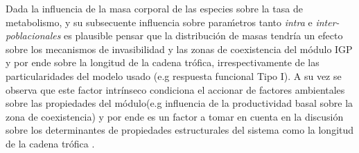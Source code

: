 Dada la influencia de la masa corporal de las especies sobre la tasa de metabolismo, y su subsecuente influencia sobre para\'metros tanto \emph{intra} e \emph{inter-poblacionales} \citep{savage2004predominance,brown2004toward,west1997general,savage2004effects,pawar2012dimensionality,mcgill2006allometric,peters1986ecological,kiltie2000scaling,yodzis1992body} es plausible pensar que la distribuci\'on de masas tendr\'ia un efecto sobre los mecanismos de invasibilidad y las zonas de coexistencia del m\'odulo IGP y por ende sobre la longitud de la cadena tr\'ofica, irrespectivamente de las particularidades del modelo usado (e.g respuesta funcional Tipo I). A su vez se observa que este factor intr\'inseco condiciona el accionar de factores ambientales sobre las propiedades del m\'odulo(e.g influencia de la productividad basal sobre la zona de coexistencia) y por ende es un factor a tomar en cuenta en la discusi\'on sobre los determinantes de propiedades estructurales del sistema como la longitud de la cadena tr\'ofica \citep{takimoto2013environmental,post2002long}.



